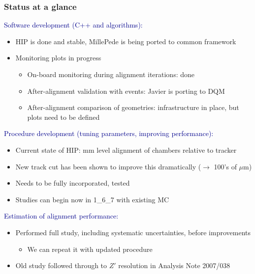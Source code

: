 \documentclass[compress]{beamer}
\begin{document}
\begin{frame}
\frametitle{Status at a glance}
\scriptsize

\begin{minipage}{\linewidth}
\textcolor{darkblue}{Software development (C++ and algorithms):}
\begin{itemize}
\item \scriptsize HIP is done and stable, MillePede is being ported to common framework
\item \scriptsize Monitoring plots in progress
\begin{itemize}
\item \scriptsize On-board monitoring during alignment iterations: done
\item \scriptsize After-alignment validation with events: Javier is porting to DQM
\item \scriptsize After-alignment comparison of geometries: infrastructure in place, but plots need to be defined
\end{itemize}
\end{itemize}

\textcolor{darkblue}{Procedure development (tuning parameters, improving performance):}
\begin{itemize}
\item \scriptsize Current state of HIP: mm level alignment of chambers relative to tracker
\item \scriptsize New track cut has been shown to improve this dramatically ($\to$ 100's of $\mu$m)
\item \scriptsize Needs to be fully incorporated, tested
\item \scriptsize Studies can begin now in 1\_6\_7 with existing MC
\end{itemize}

\textcolor{darkblue}{Estimation of alignment performance:}
\begin{itemize}
\item \scriptsize Performed full study, including systematic uncertainties, before improvements
\begin{itemize}
\item \scriptsize We can repeat it with updated procedure
\end{itemize}
\item \scriptsize Old study followed through to $Z'$ resolution in Analysis Note 2007/038
\end{itemize}
\end{minipage}

\textcolor{blue}{}
\end{frame}
\end{document}
